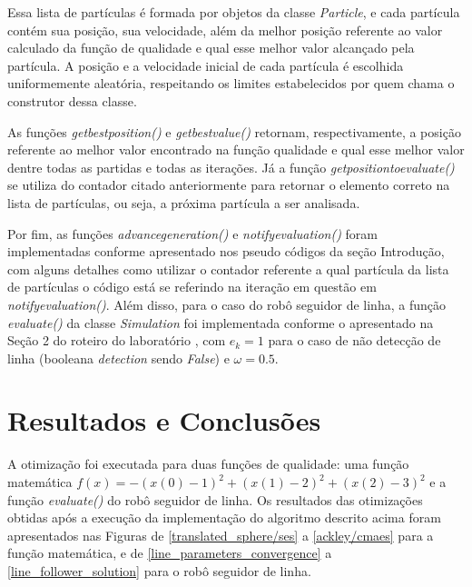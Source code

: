 \documentclass[conference]{IEEEtran}
\begin{document}
Essa lista de partículas é formada por objetos da classe \textit{Particle}, e cada partícula contém sua posição, sua velocidade, além da melhor posição referente ao valor calculado da função de qualidade e qual esse melhor valor alcançado pela partícula. A posição e a velocidade inicial de cada partícula é escolhida uniformemente aleatória, respeitando os limites estabelecidos por quem chama o construtor dessa classe. 

As funções \textit{get\underline{\space}best\underline{\space}position()} e \textit{get\underline{\space}best\underline{\space}value()} retornam, respectivamente, a posição referente ao melhor valor encontrado na função qualidade e qual esse melhor valor dentre todas as partidas e todas as iterações. Já a função \textit{get\underline{\space}position\underline{\space}to\underline{\space}evaluate()} se utiliza do contador citado anteriormente para retornar o elemento correto na lista de partículas, ou seja, a próxima partícula a ser analisada.

Por fim, as funções \textit{advance\underline{\space}generation()} e \textit{notify\underline{\space}evaluation()} foram implementadas conforme apresentado nos pseudo códigos da seção Introdução, com alguns detalhes como utilizar o contador referente a qual partícula da lista de partículas o código está se referindo na iteração em questão em \textit{notify\underline{\space}evaluation()}. Além disso, para o caso do robô seguidor de linha, a função \textit{evaluate()} da classe \textit{Simulation} foi implementada conforme o apresentado na Seção 2 do roteiro do laboratório \cite{b1}, com $e_k = 1$ para o caso de não detecção de linha (booleana \textit{detection} sendo \textit{False}) e $\omega = 0.5$. 

\section{Resultados e Conclusões}
A otimização foi executada para duas funções de qualidade: uma função matemática $f\left ( x \right ) = - \left ( x\left ( 0 \right ) - 1 \right )^{2} + \left ( x\left ( 1 \right ) - 2 \right )^{2} + \left ( x\left ( 2 \right ) - 3 \right )^{2}$ e a função \textit{evaluate()} do robô seguidor de linha. Os resultados das otimizações obtidas após a execução da implementação do algoritmo descrito acima foram apresentados nas Figuras de \ref{translated_sphere/ses} a \ref{ackley/cmaes} para a função matemática, e de \ref{line_parameters_convergence} a \ref{line_follower_solution} para o robô seguidor de linha.
\end{document}
